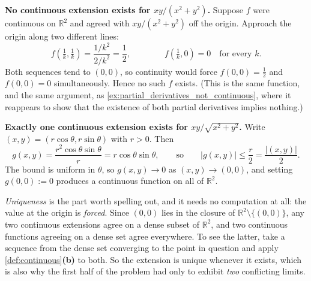 \begin{exercisesolution}
\label{sol:problems_at_origin}
\textbf{No continuous extension exists for $xy/(x^2+y^2)$.} Suppose $f$ were continuous on
$\mathbb{R}^2$ and agreed with $xy/(x^2+y^2)$ off the origin. Approach the origin along two
different lines:
\[f\!\left(\tfrac1k,\tfrac1k\right) = \frac{1/k^2}{2/k^2} = \frac12,
  \qquad\qquad
  f\!\left(\tfrac1k,0\right) = 0 \quad\text{for every } k.\]
Both sequences tend to $(0,0)$, so continuity would force
$f(0,0) = \tfrac12$ and $f(0,0) = 0$ simultaneously. Hence no such $f$ exists. (This is the same
function, and the same argument, as \cref{ex:partial_derivatives_not_continuous},
where it reappears to show that the existence of both partial derivatives implies nothing.)

\textbf{Exactly one continuous extension exists for $xy/\sqrt{x^2+y^2}$.} Write
$(x,y) = (r\cos\theta, r\sin\theta)$ with $r > 0$. Then
\[g(x,y) = \frac{r^2\cos\theta\sin\theta}{r} = r\cos\theta\sin\theta,
  \qquad\text{so}\qquad |g(x,y)| \leq \frac r2 = \frac{|(x,y)|}{2}.\]
The bound is uniform in $\theta$, so $g(x,y) \to 0$ as $(x,y) \to (0,0)$, and setting
$g(0,0) := 0$ produces a continuous function on all of $\mathbb{R}^2$.

\textit{Uniqueness} is the part worth spelling out, and it needs no computation at all: the value
at the origin is \emph{forced}. Since $(0,0)$ lies in the closure of
$\mathbb{R}^2\setminus\{(0,0)\}$, any two continuous extensions agree on a dense subset of
$\mathbb{R}^2$, and two continuous functions agreeing on a dense set agree everywhere. To see the
latter, take a sequence from the dense set converging to the point in question and apply
\cref{def:continuous}\textbf{(b)} to both. So the extension is unique whenever it exists, which
is also why the first half of the problem had only to exhibit \emph{two} conflicting limits.
\end{exercisesolution}

